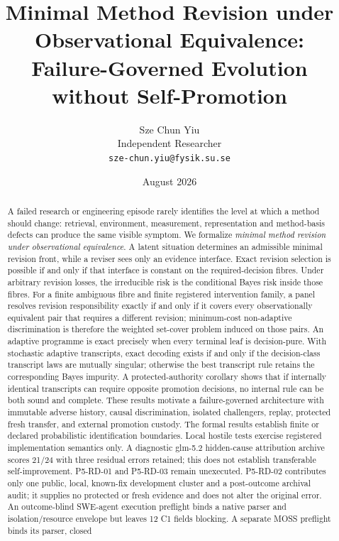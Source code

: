 \documentclass[11pt]{article}
\title{Minimal Method Revision under Observational Equivalence:\\
Failure-Governed Evolution without Self-Promotion}
\author{Sze Chun Yiu\\Independent Researcher\\\texttt{sze-chun.yiu@fysik.su.se}}
\date{August 2026}
\begin{document}
\maketitle

\begin{abstract}
A failed research or engineering episode rarely identifies the level at which a
method should change: retrieval, environment, measurement, representation and
method-basis defects can produce the same visible symptom. We formalize
\emph{minimal method revision under observational equivalence}. A latent
situation determines an admissible minimal revision front, while a reviser sees
only an evidence interface. Exact revision selection is possible if and only if
that interface is constant on the required-decision fibres. Under arbitrary
revision losses, the irreducible risk is the conditional Bayes risk inside
those fibres. For a finite ambiguous fibre and finite registered intervention
family, a panel resolves revision responsibility exactly if and only if it covers
every observationally equivalent pair that requires a different revision;
minimum-cost non-adaptive discrimination is therefore the weighted set-cover
problem induced on those pairs. An adaptive programme is exact precisely when
every terminal leaf is decision-pure. With stochastic adaptive transcripts,
exact decoding exists if and only if the decision-class transcript laws are
mutually singular; otherwise the best transcript rule retains the corresponding
Bayes impurity. A protected-authority corollary shows
that if internally identical transcripts can require opposite promotion
decisions, no internal rule can be both sound and complete. These results
motivate a failure-governed architecture with immutable adverse history,
causal discrimination, isolated challengers, replay, protected fresh transfer,
and external promotion custody. The formal results establish finite or declared
probabilistic identification boundaries. Local hostile tests exercise registered
implementation semantics only. A diagnostic glm-5.2 hidden-cause attribution
archive scores 21/24 with three residual errors retained; this does not establish
transferable self-improvement. P5-RD-01 and P5-RD-03 remain unexecuted.
P5-RD-02 contributes only one public, local, known-fix development cluster and
a post-outcome archival audit; it supplies no protected or fresh evidence and
does not alter the original error. An outcome-blind SWE-agent execution
preflight binds a native parser and isolation/resource envelope but leaves 12
C1 fields blocking. A separate MOSS preflight binds its parser, closed

\end{abstract}
\end{document}

